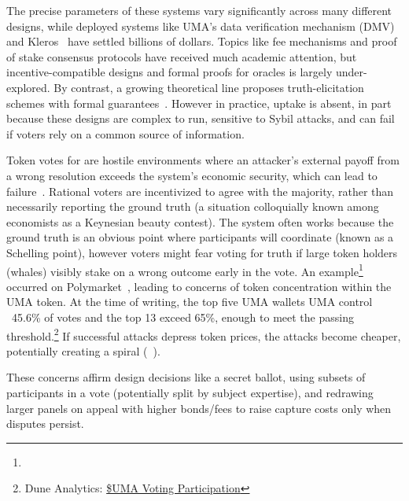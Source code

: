 The precise parameters of these systems vary significantly across many different designs, while deployed systems like UMA's data verification mechanism (DMV)~\cite{uma} and Kleros~\cite{kleros} have settled billions of dollars. Topics like fee mechanisms and proof of stake consensus protocols have received much academic attention, but incentive-compatible designs and formal proofs for oracles is largely under-explored. By contrast, a growing theoretical line proposes truth-elicitation schemes with formal guarantees~\cite{Pre04,SKC25}. However in practice, uptake is absent, in part because these designs are complex to run, sensitive to Sybil attacks, and can fail if voters rely on a common source of information.

Token votes for \depms are hostile environments where an attacker’s external payoff from a wrong resolution exceeds the system’s economic security, which can lead to failure~\cite{FoBo19}. Rational voters are incentivized to agree with the majority, rather than necessarily reporting the ground truth (a situation colloquially known among economists as a Keynesian beauty contest). The system often works because the ground truth is an obvious point where participants will coordinate (known as a Schelling point), however voters might fear voting for truth if large token holders (whales) visibly stake on a wrong outcome early in the vote. An example\footnote{} occurred on Polymarket~\cite{Rey25}, leading to concerns of token concentration within the UMA token. At the time of writing, the top five UMA wallets UMA control ~45.6\% of votes and the top 13 exceed 65\%, enough to meet the passing threshold.\footnote{Dune Analytics: \href{https://dune.com/uma\_protocol/uma-protocol}{\$UMA Voting Participation}} If successful attacks depress token prices, the attacks become cheaper, potentially creating a spiral (\cf~\cite{KM21}). 

These concerns affirm design decisions like a secret ballot, using subsets of participants in a vote (potentially split by subject expertise), and redrawing larger panels on appeal with higher bonds/fees to raise capture costs only when disputes persist.


